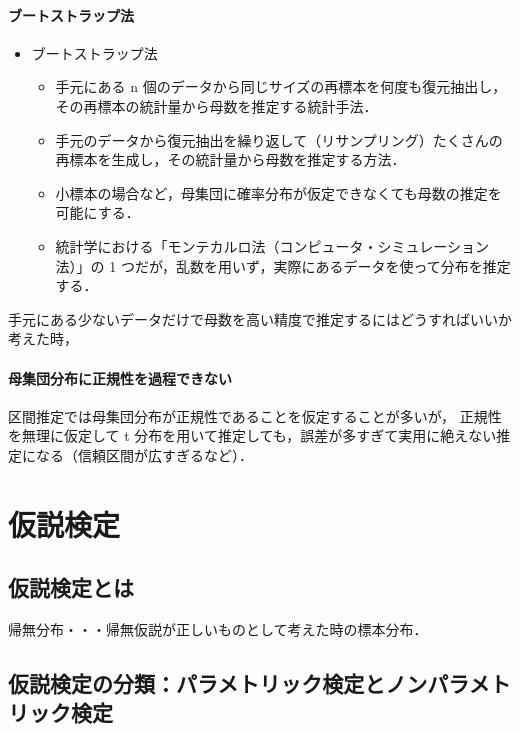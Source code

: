 \subsubsection{ブートストラップ法}

\begin{itemize}
  \item ブートストラップ法
        \begin{itemize}
          \item 手元にある n 個のデータから同じサイズの再標本を何度も復元抽出し，その再標本の統計量から母数を推定する統計手法．
          \item 手元のデータから復元抽出を繰り返して（リサンプリング）たくさんの再標本を生成し，その統計量から母数を推定する方法．
          \item 小標本の場合など，母集団に確率分布が仮定できなくても母数の推定を可能にする．
          \item 統計学における「モンテカルロ法（コンピュータ・シミュレーション法）」の 1 つだが，乱数を用いず，実際にあるデータを使って分布を推定する．
        \end{itemize}
\end{itemize}

手元にある少ないデータだけで母数を高い精度で推定するにはどうすればいいか考えた時，

\subsubsection{母集団分布に正規性を過程できない}

区間推定では母集団分布が正規性であることを仮定することが多いが，
正規性を無理に仮定して t 分布を用いて推定しても，誤差が多すぎて実用に絶えない推定になる（信頼区間が広すぎるなど）．


\chapter{仮説検定}

\section{仮説検定とは}

帰無分布・・・帰無仮説が正しいものとして考えた時の標本分布．

\section{仮説検定の分類：パラメトリック検定とノンパラメトリック検定}
